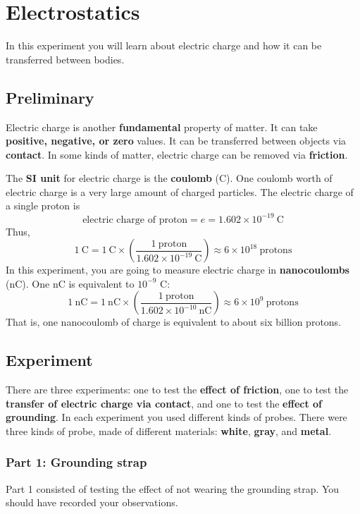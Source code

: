 \setcounter{chapter}{0}
\chapter{Electrostatics}
%
In this experiment you will learn about electric charge and how it can be transferred between bodies.
%
\section{Preliminary}
%
Electric charge is another \textbf{fundamental} property of matter. It can take \textbf{positive, negative, or zero} values. It can be transferred between objects via \textbf{contact}. In some kinds of matter, electric charge can be removed via \textbf{friction}.

The \textbf{SI unit} for electric charge is the \textbf{coulomb} (C). One coulomb worth of electric charge is a very large amount of charged particles. The electric charge of a single proton is
\begin{equation}
	\text{electric charge of proton} = e = 1.602 \times 10^{-19} \ \text{C}
\end{equation}
Thus,
\begin{equation}
	1 \ \text{C} = 1 \ \text{C} \times \left(\frac{1 \ \text{proton}}{1.602 \times 10^{-19} \ \text{C}}\right) \approx 6 \times 10^{18} \ \text{protons}
\end{equation}
In this experiment, you are going to measure electric charge in \textbf{nanocoulombs} (nC). One nC is equivalent to $10^{-9}$ C:
\begin{equation}
	1 \ \text{nC} = 1 \ \text{nC} \times \left(\frac{1 \ \text{proton}}{1.602 \times 10^{-10} \ \text{nC}}\right) \approx 6 \times 10^{9} \ \text{protons}
\end{equation}
That is, one nanocoulomb of charge is equivalent to about six billion protons.
%
\section{Experiment}
%
There are three experiments: one to test the \textbf{effect of friction}, one to test the \textbf{transfer of electric charge via contact}, and one to test the \textbf{effect of grounding}. In each experiment you used different kinds of probes. There were three kinds of probe, made of different materials: \textbf{white}, \textbf{gray}, and \textbf{metal}.
%
\subsection{Part 1: Grounding strap}
%
Part 1 consisted of testing the effect of not wearing the grounding strap. You should have recorded your observations.
%
